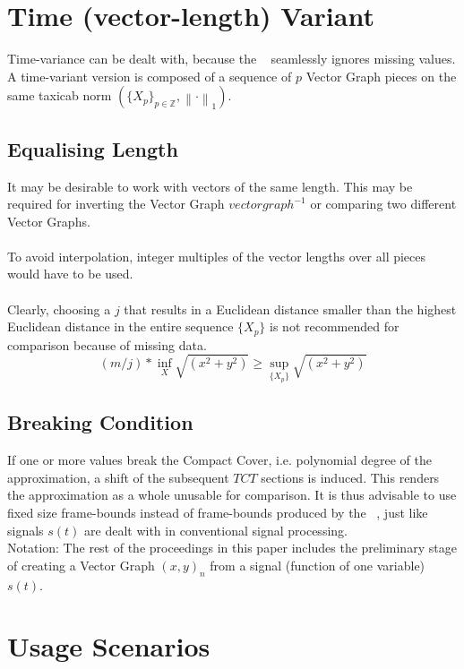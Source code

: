 \documentclass{report}
\newcommand\norm[1]{\left\lVert#1\right\rVert}
\begin{document}
\chapter{Time (vector-length) Variant}
Time-variance can be dealt with, because the ~\cite[Stopeight\_Analyzer.tex]{Analyzer} seamlessly ignores missing values. A time-variant version is composed of a sequence of $p$ Vector Graph pieces on the same taxicab norm $(\{X_{p}\}_{p\in \mathbb{Z}},\norm{\cdot}_1)$.
\section{Equalising Length}
It may be desirable to work with vectors of the same length. This may be required for inverting the Vector Graph $vectorgraph^{-1}$ or comparing two different Vector Graphs.\\\\
To avoid interpolation, integer multiples of the vector lengths over all pieces would have to be used.\\\\
Clearly, choosing a $j$ that results in a Euclidean distance smaller than the highest Euclidean distance in the entire sequence $\{X_{p}\}$ is not recommended for comparison because of missing data.
\begin{equation}
(m/j)*\inf \limits _{X} \sqrt{(x^2+y^2)} \geq \sup \limits _{\{X_{p}\}} \sqrt{(x^2+y^2)}\label{eq:4}
\end{equation}
\section{Breaking Condition}
If one or more values break the Compact Cover, i.e. polynomial degree of the approximation, a shift of the subsequent $TCT$ sections is induced. This renders the approximation as a whole unusable for comparison. It is thus advisable to use fixed size frame-bounds instead of frame-bounds produced by the ~\cite[Stopeight\_Analyzer.tex]{Analyzer}, just like signals $s(t)$ are dealt with in conventional signal processing.\\
Notation: The rest of the proceedings in this paper includes the preliminary stage of creating a Vector Graph $(x,y)_{n}$ from a signal (function of one variable) $s(t)$. 

\chapter{Usage Scenarios}
\end{document}
